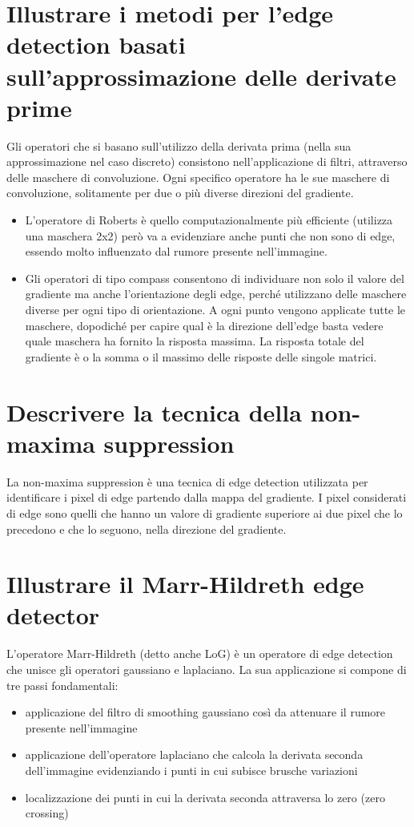 \section{Illustrare i metodi per l’edge detection basati sull’approssimazione delle derivate prime}
Gli operatori che si basano sull'utilizzo della derivata prima (nella sua approssimazione nel caso discreto) consistono nell'applicazione di filtri, attraverso delle maschere di convoluzione. Ogni specifico operatore ha le sue maschere di convoluzione, solitamente per due o più diverse direzioni del gradiente.
\begin{itemize}
	\item L'operatore di Roberts è quello computazionalmente più efficiente (utilizza una maschera 2x2) però va a evidenziare anche punti che non sono di edge, essendo molto influenzato dal rumore presente nell'immagine.
	
	\item Gli operatori di tipo compass consentono di individuare non solo il valore del gradiente ma anche l'orientazione degli edge, perché utilizzano delle maschere diverse per ogni tipo di orientazione. A ogni punto vengono applicate tutte le maschere, dopodiché per capire qual è la direzione dell'edge basta vedere quale maschera ha fornito la risposta massima. La risposta totale del gradiente è o la somma o il massimo delle risposte delle singole matrici.
\end{itemize}

\section{Descrivere la tecnica della non-maxima suppression}
La non-maxima suppression è una tecnica di edge detection utilizzata per identificare i pixel di edge partendo dalla mappa del gradiente. I pixel considerati di edge sono quelli che hanno un valore di gradiente superiore ai due pixel che lo precedono e che lo seguono, nella direzione del gradiente.

\section{Illustrare il Marr-Hildreth edge detector}
L'operatore Marr-Hildreth (detto anche LoG) è un operatore di edge detection che unisce gli operatori gaussiano e laplaciano. La sua applicazione si compone di tre passi fondamentali:
\begin{itemize}
	\item applicazione del filtro di smoothing gaussiano così da attenuare il rumore presente nell'immagine
	
	\item applicazione dell'operatore laplaciano che calcola la derivata seconda dell'immagine evidenziando i punti in cui subisce brusche variazioni
	
	\item localizzazione dei punti in cui la derivata seconda attraversa lo zero (zero crossing)
\end{itemize}

